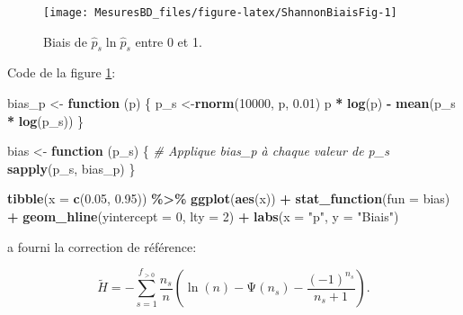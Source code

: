 \documentclass[
  11pt,
  american,
  a4paper,
  extrafontsizes,onecolumn,openright
  ]{memoir}
\newenvironment{Shaded}{\begin{snugshade}}{\end{snugshade}}
\newcommand{\AttributeTok}[1]{\textcolor[rgb]{0.13,0.29,0.53}{#1}}
\newcommand{\CommentTok}[1]{\textcolor[rgb]{0.56,0.35,0.01}{\textit{#1}}}
\newcommand{\ControlFlowTok}[1]{\textcolor[rgb]{0.13,0.29,0.53}{\textbf{#1}}}
\newcommand{\DecValTok}[1]{\textcolor[rgb]{0.00,0.00,0.81}{#1}}
\newcommand{\FloatTok}[1]{\textcolor[rgb]{0.00,0.00,0.81}{#1}}
\newcommand{\FunctionTok}[1]{\textcolor[rgb]{0.13,0.29,0.53}{\textbf{#1}}}
\newcommand{\NormalTok}[1]{#1}
\newcommand{\OtherTok}[1]{\textcolor[rgb]{0.56,0.35,0.01}{#1}}
\newcommand{\SpecialCharTok}[1]{\textcolor[rgb]{0.81,0.36,0.00}{\textbf{#1}}}
\newcommand{\StringTok}[1]{\textcolor[rgb]{0.31,0.60,0.02}{#1}}
\begin{document}
\scriptsize

\begin{figure}

{\centering \texttt{[image: MesuresBD\_files/figure-latex/ShannonBiaisFig-1]} 

}

\caption{Biais de \(\hat{p}_s \ln\hat{p}_s\) entre 0 et 1.}\label{fig:ShannonBiaisFig}
\end{figure}

\normalsize

Code de la figure \ref{fig:ShannonBiaisFig}:

\scriptsize

\begin{Shaded}
\begin{Highlighting}[]
\NormalTok{bias\_p }\OtherTok{\textless{}{-}} \ControlFlowTok{function}\NormalTok{ (p) \{}
\NormalTok{  p\_s }\OtherTok{\textless{}{-}}\FunctionTok{rnorm}\NormalTok{(}\DecValTok{10000}\NormalTok{, p, }\FloatTok{0.01}\NormalTok{)}
\NormalTok{  p }\SpecialCharTok{*} \FunctionTok{log}\NormalTok{(p) }\SpecialCharTok{{-}} \FunctionTok{mean}\NormalTok{(p\_s }\SpecialCharTok{*} \FunctionTok{log}\NormalTok{(p\_s))}
\NormalTok{\}}

\NormalTok{bias }\OtherTok{\textless{}{-}} \ControlFlowTok{function}\NormalTok{ (p\_s) \{}
  \CommentTok{\# Applique bias\_p à chaque valeur de p\_s}
  \FunctionTok{sapply}\NormalTok{(p\_s, bias\_p)}
\NormalTok{\}}

\FunctionTok{tibble}\NormalTok{(}\AttributeTok{x =} \FunctionTok{c}\NormalTok{(}\FloatTok{0.05}\NormalTok{, }\FloatTok{0.95}\NormalTok{)) }\SpecialCharTok{\%\textgreater{}\%} 
  \FunctionTok{ggplot}\NormalTok{(}\FunctionTok{aes}\NormalTok{(x)) }\SpecialCharTok{+} 
    \FunctionTok{stat\_function}\NormalTok{(}\AttributeTok{fun =}\NormalTok{ bias) }\SpecialCharTok{+}
    \FunctionTok{geom\_hline}\NormalTok{(}\AttributeTok{yintercept =} \DecValTok{0}\NormalTok{, }\AttributeTok{lty =} \DecValTok{2}\NormalTok{) }\SpecialCharTok{+}
    \FunctionTok{labs}\NormalTok{(}\AttributeTok{x =} \StringTok{"p"}\NormalTok{, }\AttributeTok{y =} \StringTok{"Biais"}\NormalTok{)}
\end{Highlighting}
\end{Shaded}

\normalsize

\textcite{Grassberger1988} a fourni la correction de référence:

\begin{equation}
  \label{eq:Grassberger1988}
  \tilde{H}
  = -\sum^{f_{>0}}_{s=1}{
    \frac{n_s}{n} \left( \ln\left( n \right) - \mathrm{\Psi}\left( n_s \right) 
    -\frac{{\left( -1 \right)}^{n_s}}{n_s + 1} \right)
  }.
\end{equation}
\end{document}
